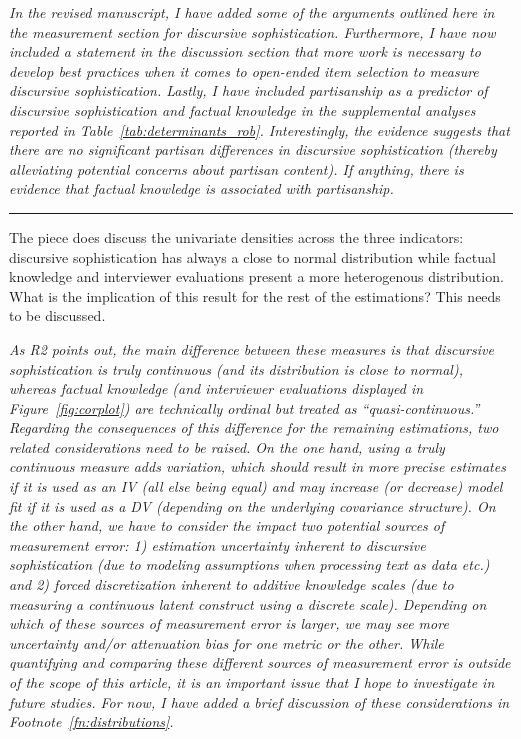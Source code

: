 \textit{In the revised manuscript, I have added some of the arguments outlined here in the measurement section for discursive sophistication. Furthermore, I have now included a statement in the discussion section that more work is necessary to develop best practices when it comes to open-ended item selection to measure discursive sophistication. Lastly, I have included partisanship as a predictor of discursive sophistication and factual knowledge in the supplemental analyses reported in Table~\ref{tab:determinants_rob}. Interestingly, the evidence suggests that there are no significant partisan differences in discursive sophistication (thereby alleviating potential concerns about partisan content). If anything, there is evidence that factual knowledge is associated with partisanship.}
	

\rule{\linewidth}{.01cm}

The piece does discuss the univariate densities across the three indicators: discursive sophistication has always a close to normal distribution while factual knowledge and interviewer evaluations present a more heterogenous distribution. What is the implication of this result for the rest of the estimations? This needs to be discussed.

\textit{As R2 points out, the main difference between these measures is that discursive sophistication is truly continuous (and its distribution is close to normal), whereas factual knowledge (and interviewer evaluations displayed in Figure~\ref{fig:corplot}) are technically ordinal but treated as ``quasi-continuous.'' Regarding the consequences of this difference for the remaining estimations, two related considerations need to be raised. On the one hand, using a truly continuous measure adds variation, which should result in more precise estimates if it is used as an IV (all else being equal) and may increase (or decrease) model fit if it is used as a DV (depending on the underlying covariance structure). On the other hand, we have to consider the impact two potential sources of measurement error: 1) estimation uncertainty inherent to discursive sophistication (due to modeling assumptions when processing text as data etc.) and 2) forced discretization inherent to additive knowledge scales (due to measuring a continuous latent construct using a discrete scale). Depending on which of these sources of measurement error is larger, we may see more uncertainty and/or attenuation bias for one metric or the other. While quantifying and comparing these different sources of measurement error is outside of the scope of this article, it is an important issue that I hope to investigate in future studies. For now, I have added a brief discussion of these considerations in Footnote~\ref{fn:distributions}.}


